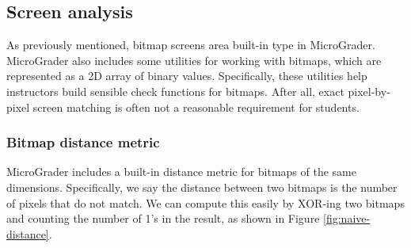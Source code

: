 \documentclass[12pt]{article}
\begin{document}
\subsection{Screen analysis}
As previously mentioned, bitmap screens area built-in type in MicroGrader.  MicroGrader also includes some utilities for working with bitmaps, which are represented as a 2D array of binary values.  Specifically, these utilities help instructors build sensible check functions for bitmaps.  After all, exact pixel-by-pixel screen matching is often not a reasonable requirement for students.

\subsubsection{Bitmap distance metric}
MicroGrader includes a built-in distance metric for bitmaps of the same dimensions.  Specifically, we say the distance between two bitmaps is the number of pixels that do not match.  We can compute this easily by XOR-ing two bitmaps and counting the number of 1's in the result, as shown in Figure \ref{fig:naive-distance}.
\end{document}
